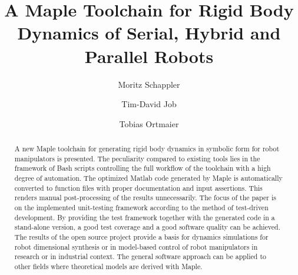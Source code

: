 \documentclass[runningheads]{llncs}
\begin{document}
%
\title{A Maple Toolchain for Rigid Body Dynamics of Serial, Hybrid and Parallel Robots}%
%
%
\author{Moritz Schappler \and Tim-David Job \and Tobias Ortmaier}
%
%
%
\maketitle              %
%
\begin{abstract}
A new Maple toolchain for generating rigid body dynamics in symbolic form for robot manipulators is presented.
The peculiarity compared to existing tools lies in the framework of Bash scripts controlling the full workflow of the toolchain with a high degree of automation. 
The optimized Matlab code generated by Maple is automatically converted to function files with proper documentation and input assertions.
This renders manual post-processing of the results unnecessarily.
The focus of the paper is on the implemented unit-testing framework according to the method of test-driven development.
By providing the test framework together with the generated code in a stand-alone version, a good test coverage and a good software quality can be achieved.
The results of the open source project provide a basis for dynamics simulations for robot dimensional synthesis or in model-based control of robot manipulators in research or in industrial context.
The general software approach can be applied to other fields where theoretical models are derived with Maple.

\end{abstract}
%
%
%
\end{document}
